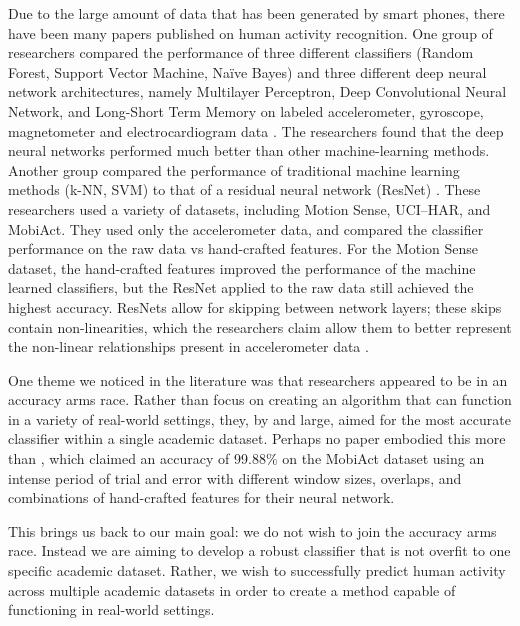 Due to the large amount of data that has been generated by  smart phones, there have been many papers published on human activity recognition. One group of researchers compared the performance of three different classifiers (Random Forest, Support Vector Machine, Na\"ive Bayes) and three different deep neural network architectures, namely Multilayer Perceptron, Deep Convolutional Neural Network, and Long-Short Term Memory on labeled accelerometer, gyroscope, magnetometer and electrocardiogram data \cite{masum2019human}. The researchers found that the deep neural networks performed much better than other machine-learning methods. Another group compared the performance of traditional machine learning methods (k-NN, SVM) to that of a residual neural network (ResNet) \cite{ferrari2019hand}. These researchers used a variety of datasets, including Motion Sense, UCI--HAR, and MobiAct. They used only the accelerometer data, and compared the classifier performance on the raw data vs hand-crafted features. For the Motion Sense dataset, the hand-crafted features improved the performance of the machine learned classifiers, but the ResNet applied to the raw data still achieved the highest accuracy. ResNets allow for skipping between network layers; these skips contain non-linearities, which the researchers claim allow them to better represent the non-linear relationships present in accelerometer data \cite{he2016deep}.

One theme we noticed in the literature was that researchers appeared to be in an accuracy arms race. Rather than focus on creating an algorithm that can function in a variety of real-world settings, they, by and large, aimed for the most accurate classifier within a single academic dataset. Perhaps no paper embodied this more than \cite{vavoulas2016mobiact}, which claimed an accuracy of 99.88\% on the MobiAct dataset using an intense period of trial and error with different window sizes, overlaps, and combinations of hand-crafted features for their neural network. 

This brings us back to our main goal: we do not wish to join the accuracy arms race. Instead we are aiming to develop a robust classifier that is not overfit to one specific academic dataset. Rather, we wish to successfully predict human activity across multiple academic datasets in order to create a method capable of functioning in real-world settings. 
